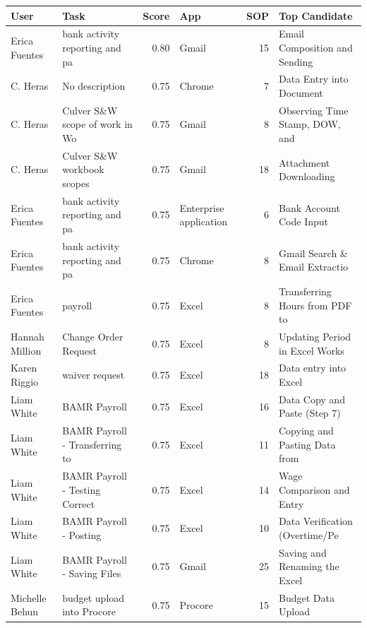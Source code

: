 \begin{tabular}{llrlrl}
\toprule
\textbf{User} & \textbf{Task} & \textbf{Score} & \textbf{App} & \textbf{SOP} & \textbf{Top Candidate} \\
\midrule
Erica Fuentes & bank activity reporting and pa & 0.80 & Gmail & 15 & Email Composition and Sending \\
C. Heras & No description & 0.75 & Chrome & 7 & Data Entry into Document \\
C. Heras & Culver S\&W scope of work in Wo & 0.75 & Gmail & 8 & Observing Time Stamp, DOW, and \\
C. Heras & Culver S\&W workbook scopes & 0.75 & Gmail & 18 & Attachment Downloading \\
Erica Fuentes & bank activity reporting and pa & 0.75 & Enterprise application & 6 & Bank Account Code Input \\
Erica Fuentes & bank activity reporting and pa & 0.75 & Chrome & 8 & Gmail Search \& Email Extractio \\
Erica Fuentes & payroll & 0.75 & Excel & 8 & Transferring Hours from PDF to \\
Hannah Million & Change Order Request & 0.75 & Excel & 8 & Updating Period in Excel Works \\
Karen Riggio & waiver request & 0.75 & Excel & 18 & Data entry into Excel \\
Liam White & BAMR Payroll & 0.75 & Excel & 16 & Data Copy and Paste (Step 7) \\
Liam White & BAMR Payroll - Transferring to & 0.75 & Excel & 11 & Copying and Pasting Data from  \\
Liam White & BAMR Payroll - Testing Correct & 0.75 & Excel & 14 & Wage Comparison and Entry \\
Liam White & BAMR Payroll - Posting & 0.75 & Excel & 10 & Data Verification (Overtime/Pe \\
Liam White & BAMR Payroll - Saving Files & 0.75 & Gmail & 25 & Saving and Renaming the Excel  \\
Michelle Behun & budget upload into Procore & 0.75 & Procore & 15 & Budget Data Upload \\
\bottomrule
\end{tabular}
